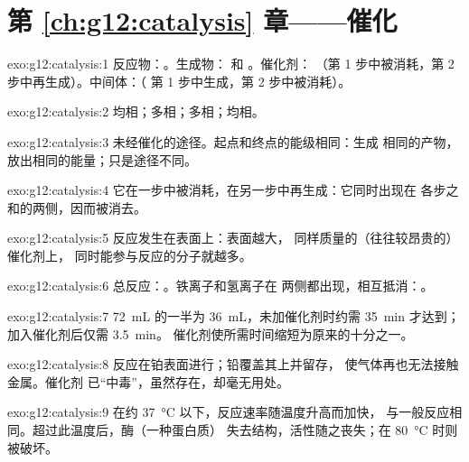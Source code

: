 \section*{第 \ref{ch:g12:catalysis} 章——催化}

\begin{solution}{exo:g12:catalysis:1}
反应物：。生成物： 和 。催化剂：
（第 1 步中被消耗，第 2 步中再生成）。中间体：（
第 1 步中生成，第 2 步中被消耗）。
\end{solution}

\begin{solution}{exo:g12:catalysis:2}
均相；多相；多相；均相。
\end{solution}

\begin{solution}{exo:g12:catalysis:3}
未经催化的途径。起点和终点的能级相同：生成
相同的产物，放出相同的能量；只是途径不同。
\end{solution}

\begin{solution}{exo:g12:catalysis:4}
它在一步中被消耗，在另一步中再生成：它同时出现在
各步之和的两侧，因而被消去。
\end{solution}

\begin{solution}{exo:g12:catalysis:5}
反应发生在表面上：表面越大，
同样质量的（往往较昂贵的）催化剂上，
同时能参与反应的分子就越多。
\end{solution}

\begin{solution}{exo:g12:catalysis:6}
总反应：。铁离子和氢离子在
两侧都出现，相互抵消：。
\end{solution}

\begin{solution}{exo:g12:catalysis:7}
\qty{72}{mL} 的一半为 \qty{36}{mL}，未加催化剂时约需 \qty{35}{min} 才达到；
加入催化剂后仅需 \qty{3.5}{min}。
催化剂使所需时间缩短为原来的十分之一。
\end{solution}

\begin{solution}{exo:g12:catalysis:8}
反应在铂表面进行；铅覆盖其上并留存，
使气体再也无法接触金属。催化剂
已“中毒”，虽然存在，却毫无用处。
\end{solution}

\begin{solution}{exo:g12:catalysis:9}
在约 \qty{37}{\celsius} 以下，反应速率随温度升高而加快，
与一般反应相同。超过此温度后，酶（一种蛋白质）
失去结构，活性随之丧失；在 \qty{80}{\celsius} 时则被破坏。
\end{solution}

